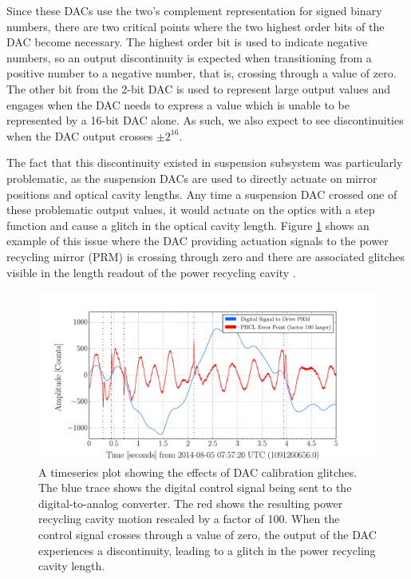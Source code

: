 Since these DACs use the two's complement 
representation for signed binary numbers, there are two critical points 
where the two highest order bits of the DAC become necessary. The highest 
order bit is used to indicate negative numbers, so an output discontinuity 
is expected when transitioning from a positive number to a negative number, 
that is, crossing through a value of zero.  
The other bit from the 2-bit DAC is used to represent large output values and 
engages when the DAC needs to express a value which is unable to be 
represented by a 16-bit DAC alone. As such, we also 
expect to see discontinuities when the DAC output crosses $\pm2^{16}$. 

The fact that this discontinuity existed in suspension subsystem was 
particularly problematic, as the suspension DACs are used to directly 
actuate on mirror positions and optical cavity lengths. Any time a 
suspension DAC crossed one of these problematic output values, it would 
actuate on the optics with a step function and cause a glitch in the 
optical cavity length. Figure \ref{fig:DAC-glitch} shows an example of 
this issue where the DAC providing actuation signals to the power recycling 
mirror (PRM) is crossing through zero and there are associated glitches 
visible in the length readout of the power recycling cavity \cite{Nuttall:2015dqa}.

\begin{figure}[ht!]%
\includegraphics[width=\textwidth]{figures/detchar/PRCL-DAC-glitch}
\caption[DAC glitches in PRCL]{A timeseries plot showing the effects of %
         DAC calibration glitches. The blue trace shows the digital control%
         signal being sent to the digital-to-analog converter. The red %
         shows the resulting power recycling cavity motion rescaled by a %
         factor of 100. When the control signal crosses %
         through a value of zero, the output of the DAC experiences a %
         discontinuity, leading to a glitch in the power recycling cavity %
         length.}
\label{fig:DAC-glitch}
\end{figure}

